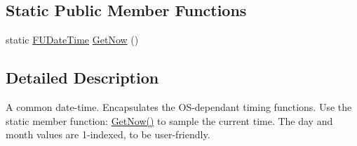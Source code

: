 \subsection*{Static Public Member Functions}
\begin{DoxyCompactItemize}
\item 
static \hyperlink{classFUDateTime}{FUDateTime} \hyperlink{classFUDateTime_afa034e1418fd2a7e8ca124cdb0559e51}{GetNow} ()
\end{DoxyCompactItemize}


\subsection{Detailed Description}
A common date-\/time. Encapsulates the OS-\/dependant timing functions. Use the static member function: \hyperlink{classFUDateTime_afa034e1418fd2a7e8ca124cdb0559e51}{GetNow()} to sample the current time. The day and month values are 1-\/indexed, to be user-\/friendly. 

